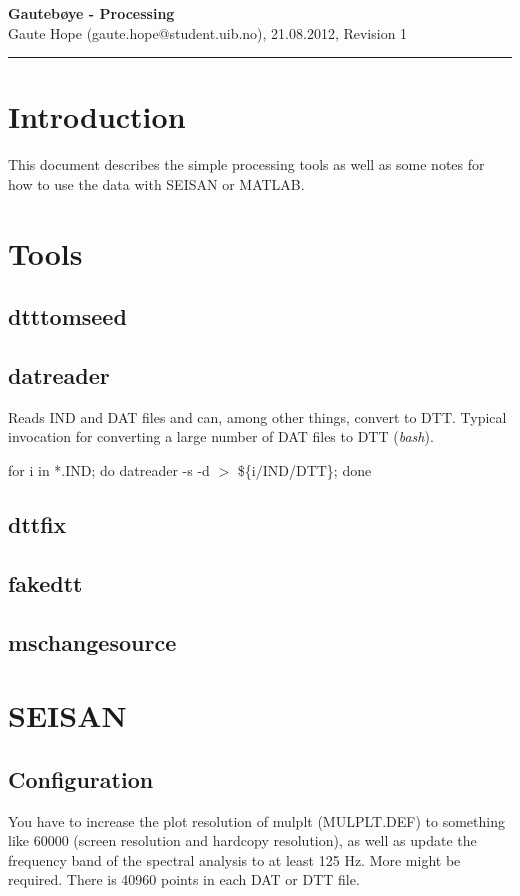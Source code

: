 \documentclass[a4paper]{article}
\newcommand{\makeheading}[2]%
        {\hspace*{-\marginparsep minus \marginparwidth}%
         \begin{minipage}[t]{\textwidth\marginparwidth\marginparsep}%
           {\large \bfseries #1}\\{#2}\\[-0.15\baselineskip]%
                 \rule{\columnwidth}{1pt}%
         \end{minipage}}
\begin{document}
\makeheading{Gautebøye - Processing}{Gaute Hope
(gaute.hope@student.uib.no), 21.08.2012, Revision 1}

\vspace{2em}
\section*{Introduction}
This document describes the simple processing tools as well as some
notes for how to use the data with SEISAN or MATLAB.

\vspace{2em}

\begin{multicols}{2}
  \section{Tools}
  \subsection{dtttomseed}
  \subsection{datreader}
    Reads IND and DAT files and can, among other things, convert to DTT.
    Typical invocation for converting a large number of DAT files to
    DTT (\textit{bash}). \\

    \begin{listing}
      for i in *.IND; do datreader -s -d $>$  \$\{i/IND/DTT\}; done
    \end{listing}

  \subsection{dttfix}
  \subsection{fakedtt}
  \subsection{mschangesource}

  \section{SEISAN}
    \subsection{Configuration}
    You have to increase the plot resolution of mulplt (MULPLT.DEF) to something like
    60000 (screen resolution and hardcopy resolution), as well as update the
    frequency band of the spectral analysis to at least 125 Hz. More
    might be required. There is 40960 points in each DAT or DTT file.


\end{multicols}
\end{document}

